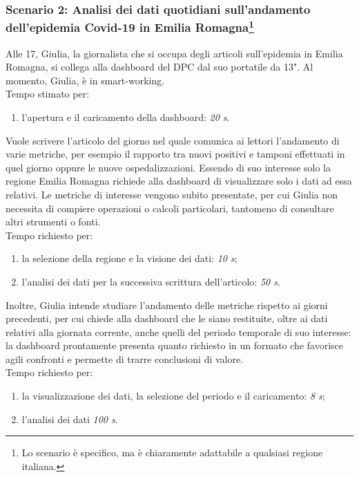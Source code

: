 \subsubsection[Scenario 2: Analisi dei dati quotidiani sull'andamento dell'epidemia Covid-19 in Emilia Romagna]{Scenario 2: Analisi dei dati quotidiani sull'andamento dell'epidemia Covid-19 in Emilia Romagna\footnote{Lo scenario è specifico, ma è chiaramente adattabile a qualsiasi regione italiana.}}
Alle 17, Giulia, la giornalista che si occupa degli articoli sull'epidemia in Emilia Romagna, si collega alla dashboard del DPC dal suo portatile da 13". Al momento, Giulia, è in smart-working.\\
Tempo stimato per:
\begin{enumerate}
    \item l'apertura e il caricamento della dashboard: \textit{20 s}.
\end{enumerate}\noindent

Vuole scrivere l'articolo del giorno nel quale comunica ai lettori l'andamento di varie metriche, per esempio il rapporto tra nuovi positivi e tamponi effettuati in quel giorno oppure le nuove ospedalizzazioni. Essendo di suo interesse solo la regione Emilia Romagna richiede alla dashboard di visualizzare solo i dati ad essa relativi. Le metriche di interesse vengono subito presentate, per cui Giulia non necessita di compiere operazioni o calcoli particolari, tantomeno di consultare altri strumenti o fonti.\\
Tempo richiesto per:
\begin{enumerate}
    \item la selezione della regione e la visione dei dati: \textit{10 s};
    \item l'analisi dei dati per la successiva scrittura dell'articolo: \textit{50 s}.
\end{enumerate}\noindent

Inoltre, Giulia intende studiare l'andamento delle metriche rispetto ai giorni precedenti, per cui chiede alla dashboard che le siano restituite, oltre ai dati relativi alla giornata corrente, anche quelli del periodo temporale di suo interesse: la dashboard prontamente presenta quanto richiesto in un formato che favorisce agili confronti e permette di trarre conclusioni di valore.\\
Tempo richiesto per:
\begin{enumerate}
    \item la visualizzazione dei dati, la selezione del periodo e il caricamento: \textit{8 s};
    \item l'analisi dei dati \textit{100 s}.
\end{enumerate}\noindent

